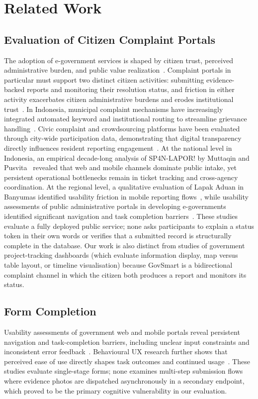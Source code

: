 \documentclass[11pt, runningheads, a4paper]{llncs}
\newcommand{\rev}[1]{#1}
\begin{document}
\section{Related Work}

\subsection{Evaluation of Citizen Complaint Portals}
The adoption of e-government services is shaped by citizen trust, perceived administrative burden,
and public value realization~\cite{maclean2022,alateyah2021,aaroe2021,dechamps2025}.
Complaint portals in particular must support two distinct citizen activities:
submitting evidence-backed reports and monitoring their resolution status, and
friction in either activity exacerbates citizen administrative burdens and erodes
institutional trust~\cite{madsen2022}. In Indonesia, municipal complaint mechanisms have increasingly
integrated automated keyword and institutional routing to streamline grievance handling~\cite{yolanda2021}.
Civic complaint and crowdsourcing platforms have been evaluated through city-wide participation data,
demonstrating that digital transparency directly influences resident reporting engagement~\cite{zhao2023}.
At the national level in Indonesia, an empirical decade-long analysis of SP4N-LAPOR! by Muttaqin
and Pusvita~\cite{muttaqin2023} revealed that web and mobile channels dominate public intake, yet persistent
operational bottlenecks remain in ticket tracking and cross-agency coordination. At the regional level,
a qualitative evaluation of Lapak Aduan in Banyumas identified usability friction in mobile reporting
flows~\cite{indrayani2025}, while usability assessments of public administrative portals in developing
e-governments identified significant navigation and task completion barriers~\cite{rafifing2022}.
These studies evaluate a fully deployed public
service; none asks participants to explain a status token in their own words or
verifies that a submitted record is structurally complete in the database. Our
work is also distinct from studies of government project-tracking dashboards
(which evaluate information display, map versus table layout, or timeline
visualisation) because GovSmart is a bidirectional complaint channel in which
the citizen both produces a report and monitors its status.

\subsection{Form Completion}
\rev{Usability assessments of government web and mobile portals reveal persistent navigation and
task-completion barriers, including unclear input constraints and inconsistent error
feedback~\cite{alsakran2021,rafifing2022}. Behavioural UX research further shows that
perceived ease of use directly shapes task outcomes and continued
usage~\cite{lewis2024}. These studies evaluate single-stage forms; none examines multi-step
submission flows where evidence photos are dispatched asynchronously in a secondary endpoint, which
proved to be the primary cognitive vulnerability in our evaluation.}
\end{document}
